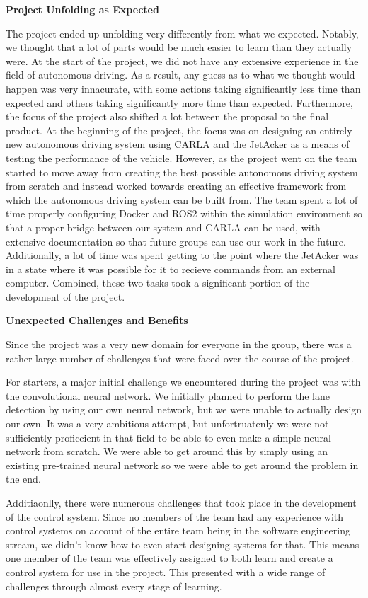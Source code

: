 \documentclass[titlepage,draft]{article}
\begin{document}
{\textbf{Project Unfolding as Expected}

The project ended up unfolding very differently from what we expected. Notably, we thought that a lot of parts would be much easier to learn than they actually were. At the start of the project, we did not have any extensive experience in the field of autonomous driving. As a result, any guess as to what we thought would happen was very innacurate, with some actions taking significantly less time than expected and others taking significantly more time than expected. Furthermore, the focus of the project also shifted a lot between the proposal to the final product. At the beginning of the project, the focus was on designing an entirely new autonomous driving system using CARLA and the JetAcker as a means of testing the performance of the vehicle. However, as the project went on the team started to move away from creating the best possible autonomous driving system from scratch and instead worked towards creating an effective framework from which the autonomous driving system can be built from. The team spent a lot of time properly configuring Docker and ROS2 within the simulation environment so that a proper bridge between our system and CARLA can be used, with extensive documentation so that future groups can use our work in the future. Additionally, a lot of time was spent getting to the point where the JetAcker was in a state where it was possible for it to recieve commands from an external computer. Combined, these two tasks took a significant portion of the development of the project.


\textbf{Unexpected Challenges and Benefits}

Since the project was a very new domain for everyone in the group, there was a rather large number of challenges that were faced over the course of the project.

For starters, a major initial challenge we encountered during the project was with the convolutional neural network. We initially planned to perform the lane detection by using our own neural network, but we were unable to actually design our own. It was a very ambitious attempt, but unfortruatenly we were not sufficiently proficcient in that field to be able to even make a simple neural network from scratch. We were able to get around this by simply using an existing pre-trained neural network so we were able to get around the problem in the end.

Additiaonlly, there were numerous challenges that took place in the development of the control system. Since no members of the team had any experience with control systems on account of the entire team being in the software engineering stream, we didn't know how to even start designing systems for that. This means one member of the team was effectively assigned to both learn and create a control system for use in the project. This presented with a wide range of challenges through almost every stage of learning.

}
\end{document}
